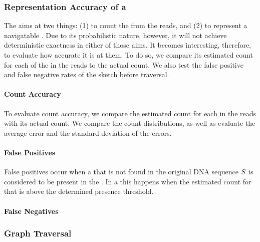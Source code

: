 \subsubsection{Representation Accuracy of a \dBCM}

The \dBCM aims at two things: (1) to count the  from the reads, and (2) to represent a navigatable \dBG. Due to its probabilistic nature, however, it will not achieve deterministic exactness in either of those aims. It becomes interesting, therefore, to evaluate how accurate it is at them. To do so, we compare its estimated count for each of the  in the reads to the  actual count. We also test the false positive and false negative rates of the sketch before traversal.

\paragraph{Count Accuracy} To evaluate count accuracy, we compare the estimated count for each \kmer in the reads with its actual count. We compare the count distributions, as well as evaluate  the average error and the standard deviation of the errors.

\paragraph{False Positives} False positives occur when a \kmer that is not found in the original DNA sequence $\strname{S}$ is considered to be present in the \dBG. In a \dBCM this happens when the estimated count for that \kmer is above the determined presence threshold.

\paragraph{False Negatives}

\subsubsection{Graph Traversal}

